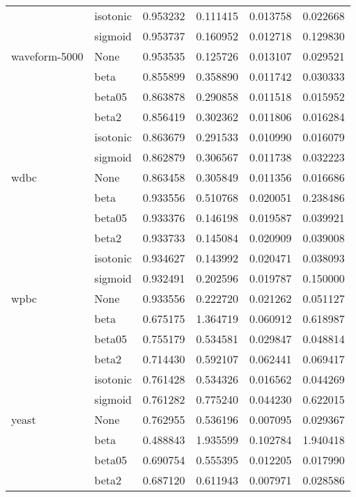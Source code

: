 \begin{tabular}{llrrrr}
        & isotonic &  0.953232 &   0.111415 &  0.013758 &  0.022668 \\
        & sigmoid &  0.953737 &   0.160952 &  0.012718 &  0.129830 \\
waveform-5000 & None &  0.953535 &   0.125726 &  0.013107 &  0.029521 \\
        & beta &  0.855899 &   0.358890 &  0.011742 &  0.030333 \\
        & beta05 &  0.863878 &   0.290858 &  0.011518 &  0.015952 \\
        & beta2 &  0.856419 &   0.302362 &  0.011806 &  0.016284 \\
        & isotonic &  0.863679 &   0.291533 &  0.010990 &  0.016079 \\
        & sigmoid &  0.862879 &   0.306567 &  0.011738 &  0.032223 \\
wdbc & None &  0.863458 &   0.305849 &  0.011356 &  0.016686 \\
        & beta &  0.933556 &   0.510768 &  0.020051 &  0.238486 \\
        & beta05 &  0.933376 &   0.146198 &  0.019587 &  0.039921 \\
        & beta2 &  0.933733 &   0.145084 &  0.020909 &  0.039008 \\
        & isotonic &  0.934627 &   0.143992 &  0.020471 &  0.038093 \\
        & sigmoid &  0.932491 &   0.202596 &  0.019787 &  0.150000 \\
wpbc & None &  0.933556 &   0.222720 &  0.021262 &  0.051127 \\
        & beta &  0.675175 &   1.364719 &  0.060912 &  0.618987 \\
        & beta05 &  0.755179 &   0.534581 &  0.029847 &  0.048814 \\
        & beta2 &  0.714430 &   0.592107 &  0.062441 &  0.069417 \\
        & isotonic &  0.761428 &   0.534326 &  0.016562 &  0.044269 \\
        & sigmoid &  0.761282 &   0.775240 &  0.044230 &  0.622015 \\
yeast & None &  0.762955 &   0.536196 &  0.007095 &  0.029367 \\
        & beta &  0.488843 &   1.935599 &  0.102784 &  1.940418 \\
        & beta05 &  0.690754 &   0.555395 &  0.012205 &  0.017990 \\
        & beta2 &  0.687120 &   0.611943 &  0.007971 &  0.028586 \\

\end{tabular}
